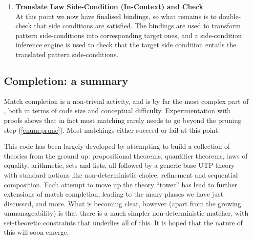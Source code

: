 \begin{enumerate}
\item

\textbf{Translate Law Side-Condition (In-Context) and Check}\\ %
At this point we now have finalised bindings,
so what remains is to double-check that side conditions
are satisfied.
The bindings are used to transform pattern side-conditions
into corresponding target ones,
and a side-condition inference engine is used
to check that the target side condition
entails the translated pattern side-conditions.

\end{enumerate} %


\subsection{Completion: a summary}

Match completion is a non-trivial activity,
and is by far the most complex part of ,
both in terms of code size and conceptual difficulty.
Experimentation with proofs shows that in fact most matching
rarely needs to go beyond the pruning step (\ref{enum:prune}).
Most matchings either succeed or fail at this point.

This code has been largely developed by attempting to build
a collection of theories from the ground up: propositional
theorems, quantifier theorems, laws of equality, arithmetic,
sets and lists, all followed by a generic base UTP theory
with standard notions like non-deterministic choice, refinement
and sequential composition.
Each attempt to move up the theory ``tower'' has lead to further extensions
of match completion, leading to the many phases we have just discussed,
and more.
What is becoming clear, however
(apart from the growing unmanageability)
is that there is a much simpler non-deterministic matcher,
with set-theoretic constraints that underlies all of this.
It is hoped that the nature of this will soon emerge.
